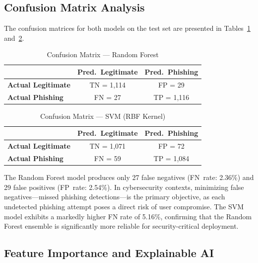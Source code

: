 \documentclass[conference]{IEEEtran}
\begin{document}
\subsection{Confusion Matrix Analysis}

The confusion matrices for both models on the test set are 
presented in Tables~\ref{tab:cm_rf} and~\ref{tab:cm_svm}.

\begin{table}[htbp]
\caption{Confusion Matrix — Random Forest}
\label{tab:cm_rf}
\centering
\renewcommand{\arraystretch}{1.3}
\begin{tabular}{lcc}
\toprule
                        & \textbf{Pred.\ Legitimate} & 
                          \textbf{Pred.\ Phishing} \\
\midrule
\textbf{Actual Legitimate} & TN = 1,114 & FP = 29   \\
\textbf{Actual Phishing}   & FN = 27    & TP = 1,116 \\
\bottomrule
\end{tabular}
\end{table}

\begin{table}[htbp]
\caption{Confusion Matrix — SVM (RBF Kernel)}
\label{tab:cm_svm}
\centering
\renewcommand{\arraystretch}{1.3}
\begin{tabular}{lcc}
\toprule
                        & \textbf{Pred.\ Legitimate} & 
                          \textbf{Pred.\ Phishing} \\
\midrule
\textbf{Actual Legitimate} & TN = 1,071 & FP = 72   \\
\textbf{Actual Phishing}   & FN = 59    & TP = 1,084 \\
\bottomrule
\end{tabular}
\end{table}

The Random Forest model produces only 27 false negatives 
(FN~rate: 2.36\%) and 29 false positives (FP~rate: 2.54\%). 
In cybersecurity contexts, minimizing false negatives—missed 
phishing detections—is the primary objective, as each 
undetected phishing attempt poses a direct risk of user 
compromise. The SVM model exhibits a markedly higher FN rate 
of 5.16\%, confirming that the Random Forest ensemble is 
significantly more reliable for security-critical deployment.

\subsection{Feature Importance and Explainable AI}
\end{document}
